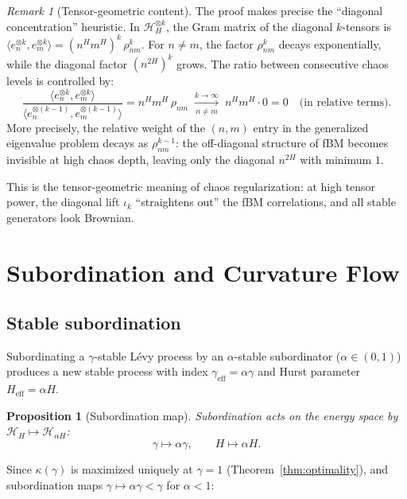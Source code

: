 \documentclass[11pt,a4paper]{article}
\theoremstyle{plain}
\newtheorem{proposition}[theorem]{Proposition}
\theoremstyle{definition}
\theoremstyle{remark}
\newtheorem{remark}[theorem]{Remark}
\newcommand{\HH}{\mathcal{H}_H}
\begin{document}
\begin{remark}[Tensor-geometric content]
\label{rem:tensor-content}
The proof makes precise the ``diagonal concentration''
heuristic.  In $\HH^{\otimes k}$, the Gram matrix
of the diagonal $k$-tensors is
$\langle e_n^{\otimes k}, e_m^{\otimes k}\rangle
= (n^H m^H)^k\,\rho_{nm}^k$.
For $n \neq m$, the factor $\rho_{nm}^k$ decays
exponentially, while the diagonal factor $(n^{2H})^k$
grows.  The ratio between consecutive chaos levels
is controlled by:
\[
  \frac{\langle e_n^{\otimes k}, e_m^{\otimes k}\rangle}
       {\langle e_n^{\otimes(k-1)}, e_m^{\otimes(k-1)}\rangle}
  = n^H m^H\,\rho_{nm}
  \;\xrightarrow[n \neq m]{k \to \infty}\;
  n^H m^H \cdot 0 = 0 \quad\text{(in relative terms)}.
\]
More precisely, the relative weight of the
$(n,m)$ entry in the generalized eigenvalue problem
decays as $\rho_{nm}^{k-1}$: the off-diagonal
structure of fBM becomes invisible at high chaos depth,
leaving only the diagonal $n^{2H}$ with minimum $1$.

This is the tensor-geometric meaning of chaos
regularization: at high tensor power, the diagonal
lift $\iota_k$ ``straightens out'' the fBM correlations,
and all stable generators look Brownian.
\end{remark}


\section{Subordination and Curvature Flow}
\label{sec:subordination}

\subsection{Stable subordination}

Subordinating a $\gamma$-stable L\'evy process by an
$\alpha$-stable subordinator ($\alpha \in (0,1)$)
produces a new stable process with index
$\gamma_{\mathrm{eff}} = \alpha\gamma$ and Hurst
parameter $H_{\mathrm{eff}} = \alpha H$.

\begin{proposition}[Subordination map]
\label{prop:subordination}
Subordination acts on the energy space by
$\HH \mapsto \mathcal{H}_{\alpha H}$:
\[
  \gamma \mapsto \alpha\gamma,
  \qquad H \mapsto \alpha H.
\]
\end{proposition}

Since $\kappa(\gamma)$ is maximized uniquely at
$\gamma = 1$ (Theorem~\ref{thm:optimality}), and
subordination maps $\gamma \mapsto \alpha\gamma < \gamma$
for $\alpha < 1$:
\end{document}

